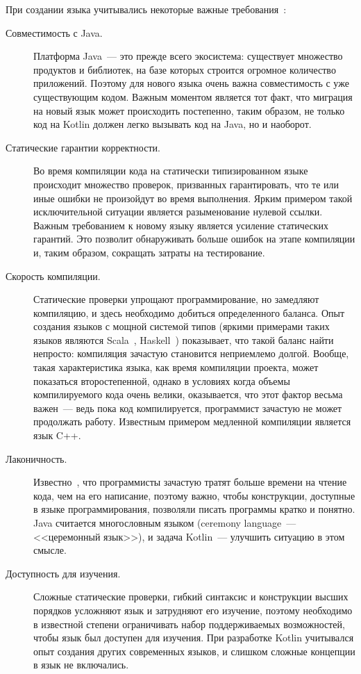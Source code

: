 При создании языка учитывались некоторые важные требования~\cite{KotlinOSP}:
\begin{description}
	\item[Совместимость с Java.] Платформа Java~--- это прежде всего экосистема: существует множество продуктов и библиотек, на базе которых строится огромное количество приложений.
	Поэтому для нового языка очень важна совместимость с уже существующим кодом. Важным моментом является тот факт, что миграция на новый язык может происходить постепенно, таким образом, не только код на Kotlin должен легко вызывать код на Java, но и наоборот.

	\item[Статические гарантии корректности.] Во время компиляции кода на статически типизированном языке происходит множество проверок, призванных гарантировать, что те или иные ошибки не произойдут во время выполнения.
	 Ярким примером такой исключительной ситуации является разыменование нулевой ссылки. Важным требованием к новому языку является усиление статических гарантий. Это позволит обнаруживать больше ошибок на этапе компиляции и, таким образом, сокращать затраты на тестирование.

	\item[Скорость компиляции.] Статические проверки упрощают программирование, но замедляют компиляцию, и здесь необходимо добиться определенного баланса. Опыт создания языков с мощной системой типов (яркими примерами таких языков являются Scala~\cite{scala-spec}, Haskell~\cite{haskell98}) показывает, что такой баланс найти непросто: компиляция зачастую становится неприемлемо долгой.
	Вообще, такая характеристика языка, как время компиляции проекта, может показаться второстепенной, однако в условиях когда объемы компилируемого кода очень велики, оказывается, что этот фактор весьма важен~--- ведь пока код компилируется, программист зачастую не может продолжать работу. Известным примером медленной компиляции является язык C++.

	\item[Лаконичность.] Известно~\cite{codecomplete}, что программисты зачастую тратят больше времени на чтение кода, чем на его написание, поэтому важно, чтобы конструкции, доступные в языке программирования, позволяли писать программы кратко и понятно.
	Java считается многословным языком (ceremony language~--- <<церемонный язык>>), и задача Kotlin~--- улучшить ситуацию в этом смысле.

	\item[Доступность для изучения.] Сложные статические проверки, гибкий синтаксис и конструкции высших порядков усложняют язык и затрудняют его изучение, поэтому необходимо в известной степени ограничивать набор поддерживаемых возможностей, чтобы язык был доступен для изучения. При разработке Kotlin учитывался опыт создания других современных языков, и слишком сложные концепции в язык не включались.


\end{description}
